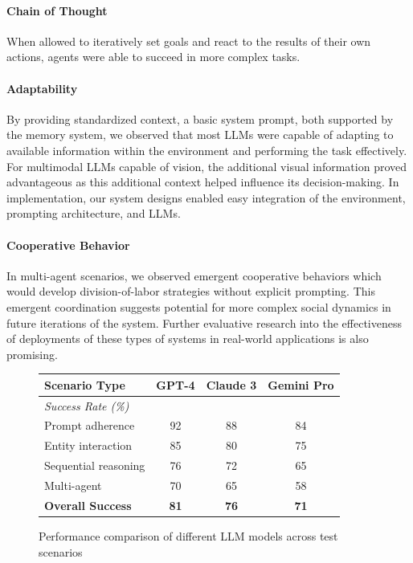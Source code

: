 \documentclass{article}
\begin{document}
\paragraph{Chain of Thought} When allowed to iteratively set goals and react to the results of their own actions, agents were able to succeed in more complex tasks.
\paragraph{Adaptability} By providing standardized context, a basic system prompt, both supported by the memory system, we observed that most LLMs were capable of adapting to available information within the environment and performing the task effectively.
For multimodal LLMs capable of vision, the additional visual information proved advantageous as this additional context helped influence its decision-making.
In implementation, our system designs enabled easy integration of the environment, prompting architecture, and LLMs.

\paragraph{Cooperative Behavior} In multi-agent scenarios, we observed emergent cooperative behaviors which would develop division-of-labor strategies without explicit prompting.
This emergent coordination suggests potential for more complex social dynamics in future iterations of the system.
Further evaluative research into the effectiveness of deployments of these types of systems in real-world applications is also promising.
\begin{figure}
    \centering
    \small
    \begin{tabular}{lccc}
        \toprule
        \textbf{Scenario Type} & \textbf{GPT-4} & \textbf{Claude 3} & \textbf{Gemini Pro} \\
        \midrule
        \multicolumn{4}{l}{\textit{Success Rate (\%)}} \\
        Prompt adherence        & 92 & 88 & 84 \\
        Entity interaction      & 85 & 80 & 75 \\
        Sequential reasoning    & 76 & 72 & 65 \\
        Multi-agent             & 70 & 65 & 58 \\
        \midrule
        \textbf{Overall Success} & \textbf{81} & \textbf{76} & \textbf{71} \\
        \bottomrule
    \end{tabular}
    \caption{Performance comparison of different LLM models across test scenarios } 
    \label{tab:model-performance}
\end{figure}
\end{document}
